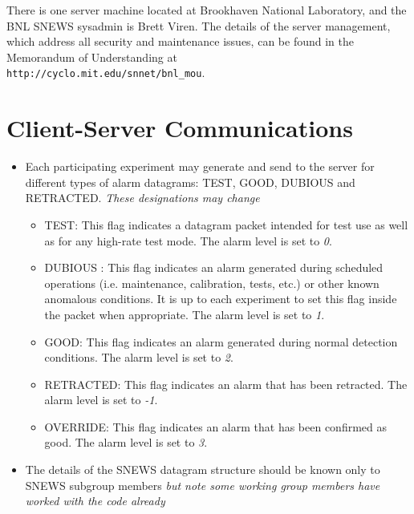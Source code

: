 \documentclass{article}
\begin{document}
There is one server machine located at Brookhaven
National Laboratory, and the BNL SNEWS sysadmin is Brett Viren.
The details of the server management, which address all
security and maintenance issues, can be found
in the Memorandum of Understanding at\\
{\tt http://cyclo.mit.edu/snnet/bnl\_mou}.

\section{Client-Server Communications}\label{alarm}
\begin{itemize}

\item Each participating experiment may generate and send to the server
for different types of alarm datagrams: TEST, GOOD, DUBIOUS and RETRACTED.
{\it These designations may change}

\begin{itemize}

\item TEST: This flag indicates a datagram packet intended for test use
as well as for any high-rate test mode.  The alarm level
is set to {\it 0}.

\item DUBIOUS : This flag indicates an alarm
generated during scheduled operations (i.e. maintenance, calibration,
tests, etc.) or other known anomalous conditions. It is up to each
experiment to set this flag inside the packet when appropriate.  The
alarm level is set to {\it 1}.

\item GOOD: This flag indicates an alarm generated during
normal detection conditions.  The alarm level is set to {\it 2}.

\item RETRACTED: This flag indicates an alarm 
that has been retracted.  The alarm level is set to {\it -1}.

\item OVERRIDE: This flag indicates an alarm 
that has been confirmed as good.  The alarm level is set to {\it 3}.

\end{itemize}
 
\item The details of the SNEWS datagram structure should
be known only to SNEWS subgroup members {\it but note some
working group members have worked with the code already} 


\end{itemize}
\end{document}

